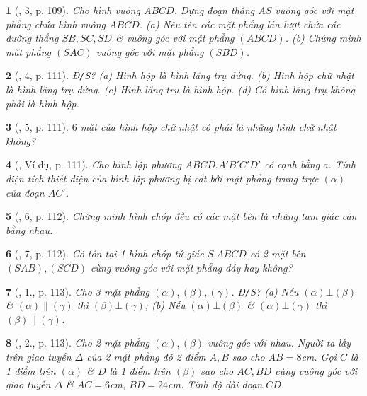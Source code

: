 \documentclass{article}
\newtheorem{baitoan}{}
\begin{document}
\begin{baitoan}[\cite{SGK_Toan_11_hinh_hoc_co_ban}, 3, p. 109]
	Cho hình vuông $ABCD$. Dựng đoạn thẳng $AS$ vuông góc với mặt phẳng chứa hình vuông $ABCD$. (a) Nêu tên các mặt phẳng lần lượt chứa các đường thẳng $SB,SC,SD$ \& vuông góc với mặt phẳng $(ABCD)$. (b) Chứng minh mặt phẳng $(SAC)$ vuông góc với mặt phẳng $(SBD)$.
\end{baitoan}

\begin{baitoan}[\cite{SGK_Toan_11_hinh_hoc_co_ban}, 4, p. 111]
	\emph{Đ\texttt{/}S?} (a) Hình hộp là hình lăng trụ đứng. (b) Hình hộp chữ nhật là hình lăng trụ đứng. (c) Hình lăng trụ là hình hộp. (d) Có hình lăng trụ không phải là hình hộp.
\end{baitoan}

\begin{baitoan}[\cite{SGK_Toan_11_hinh_hoc_co_ban}, 5, p. 111]
	$6$ mặt của hình hộp chữ nhật có phải là những hình chữ nhật không?
\end{baitoan}

\begin{baitoan}[\cite{SGK_Toan_11_hinh_hoc_co_ban}, Ví dụ, p. 111]
	Cho hình lập phương $ABCD.A'B'C'D'$ có cạnh bằng $a$. Tính diện tích thiết diện của hình lập phương bị cắt bởi mặt phẳng trung trực $(\alpha)$ của đoạn $AC'$.
\end{baitoan}

\begin{baitoan}[\cite{SGK_Toan_11_hinh_hoc_co_ban}, 6, p. 112]
	Chứng minh hình chóp đều có các mặt bên là những tam giác cân bằng nhau.
\end{baitoan}

\begin{baitoan}[\cite{SGK_Toan_11_hinh_hoc_co_ban}, 7, p. 112]
	Có tồn tại 1 hình chóp tứ giác $S.ABCD$ có 2 mặt bên $(SAB),(SCD)$ cùng vuông góc với mặt phẳng đáy hay không?
\end{baitoan}

\begin{baitoan}[\cite{SGK_Toan_11_hinh_hoc_co_ban}, 1., p. 113]
	Cho 3 mặt phẳng $(\alpha),(\beta),(\gamma)$. \emph{Đ\texttt{/}S?} (a) Nếu $(\alpha)\bot(\beta)$ \& $(\alpha)\parallel(\gamma)$ thì $(\beta)\bot(\gamma)$; (b) Nếu $(\alpha)\bot(\beta)$ \& $(\alpha)\bot(\gamma)$ thì $(\beta)\parallel(\gamma)$.
\end{baitoan}

\begin{baitoan}[\cite{SGK_Toan_11_hinh_hoc_co_ban}, 2., p. 113]
	Cho 2 mặt phẳng $(\alpha),(\beta)$ vuông góc với nhau. Người ta lấy trên giao tuyến $\Delta$ của 2 mặt phẳng đó 2 điểm $A,B$ sao cho $AB = 8$\emph{cm}. Gọi $C$ là 1 điểm trên $(\alpha)$ \& $D$ là 1 điểm trên $(\beta)$ sao cho $AC,BD$ cùng vuông góc với giao tuyến $\Delta$ \& $AC = 6$\emph{cm}, $BD = 24$\emph{cm}. Tính độ dài đoạn $CD$.
\end{baitoan}
\end{document}
